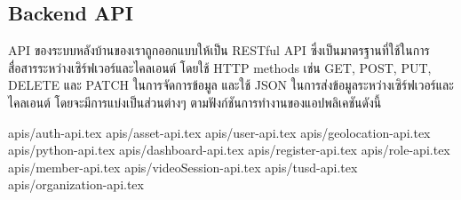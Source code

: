 \subsection{ Backend API}

\ifenglish
\else
API ของระบบหลังบ้านของเราถูกออกแบบให้เป็น RESTful API ซึ่งเป็นมาตรฐานที่ใช้ในการสื่อสารระหว่างเซิร์ฟเวอร์และไคลเอนต์ โดยใช้ HTTP methods เช่น GET, POST, PUT, DELETE และ PATCH ในการจัดการข้อมูล และใช้ JSON ในการส่งข้อมูลระหว่างเซิร์ฟเวอร์และไคลเอนต์ โดยจะมีการแบ่งเป็นส่วนต่างๆ ตามฟังก์ชันการทำงานของแอปพลิเคชันดังนี้

{apis/auth-api.tex}
{apis/asset-api.tex}
{apis/user-api.tex}
{apis/geolocation-api.tex}
{apis/python-api.tex}
{apis/dashboard-api.tex}
{apis/register-api.tex}
{apis/role-api.tex}
{apis/member-api.tex}
{apis/videoSession-api.tex}
{apis/tusd-api.tex}
{apis/organization-api.tex}
\fi